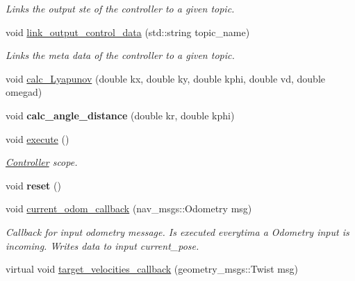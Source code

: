 \begin{DoxyCompactItemize}
\begin{DoxyCompactList}\small\item\em Links the output ste of the controller to a given topic. \end{DoxyCompactList}\item 
void \hyperlink{classController_abc1909639580e5359228c87fbd3a622b}{link\+\_\+output\+\_\+control\+\_\+data} (std\+::string topic\+\_\+name)
\begin{DoxyCompactList}\small\item\em Links the meta data of the controller to a given topic. \end{DoxyCompactList}\item 
void \hyperlink{classController_a56568ee07bb72983576e9d7c10eb3e83}{calc\+\_\+\+Lyapunov} (double kx, double ky, double kphi, double vd, double omegad)
\item 
void {\bfseries calc\+\_\+angle\+\_\+distance} (double kr, double kphi)\hypertarget{classController_a63249412728814430174c740d358a5c0}{}\label{classController_a63249412728814430174c740d358a5c0}

\item 
void \hyperlink{classController_a6661eb7307219216a7cb0a90e2a07e4d}{execute} ()\hypertarget{classController_a6661eb7307219216a7cb0a90e2a07e4d}{}\label{classController_a6661eb7307219216a7cb0a90e2a07e4d}

\begin{DoxyCompactList}\small\item\em \hyperlink{classController}{Controller} scope. \end{DoxyCompactList}\item 
void {\bfseries reset} ()\hypertarget{classController_ab5515748f1b0c82f015e039c817ee5f7}{}\label{classController_ab5515748f1b0c82f015e039c817ee5f7}

\item 
void \hyperlink{classController_a35b38608f67e7c1c34f6b7186db32ad7}{current\+\_\+odom\+\_\+callback} (nav\+\_\+msgs\+::\+Odometry msg)\hypertarget{classController_a35b38608f67e7c1c34f6b7186db32ad7}{}\label{classController_a35b38608f67e7c1c34f6b7186db32ad7}

\begin{DoxyCompactList}\small\item\em Callback for input odometry message. Is executed everytima a Odometry input is incoming. Writes data to input current\+\_\+pose. \end{DoxyCompactList}\item 
virtual void \hyperlink{classController_afa31080c1ed1e652410c5e97472b3ea5}{target\+\_\+velocities\+\_\+callback} (geometry\+\_\+msgs\+::\+Twist msg)\hypertarget{classController_afa31080c1ed1e652410c5e97472b3ea5}{}\label{classController_afa31080c1ed1e652410c5e97472b3ea5}


\end{DoxyCompactItemize}

